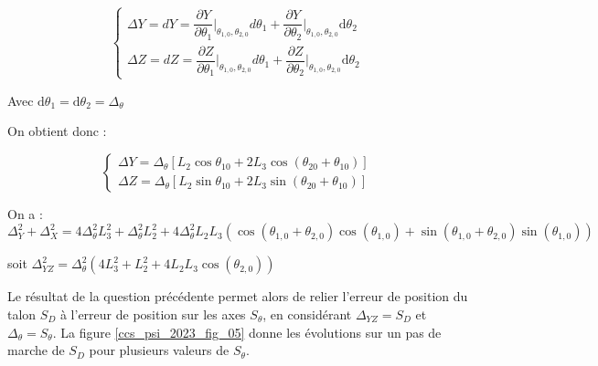 \begin{corrige}
\begin{enumerate}
$$
\left\{
\begin{array}{l}
\Delta Y=d Y=\dfrac{\partial Y}{\partial \theta_1}\vert_{\theta_{1,0},\theta_{2,0}}d\theta_1+\dfrac{\partial Y}{\partial \theta_2}\vert_{\theta_{1,0},\theta_{2,0}}\text{d}\theta_2\\
\Delta Z=d Z=\dfrac{\partial Z}{\partial \theta_1}\vert_{\theta_{1,0},\theta_{2,0}}d\theta_1+\dfrac{\partial Z}{\partial \theta_2}\vert_{\theta_{1,0},\theta_{2,0}}\text{d}\theta_2
\end{array}
\right.
$$

Avec $\text{d}\theta_1=\text{d}\theta_2=\Delta_{\theta}$

On obtient donc : 

$$
\left\{
\begin{array}{l}
\Delta Y=\Delta_{\theta}\left[L_2\cos\theta_{10}+2L_3\cos(\theta_{20}+\theta_{10})\right]\\
\Delta Z=\Delta_{\theta}\left[L_2\sin\theta_{10}+2L_3\sin(\theta_{20}+\theta_{10})\right]
\end{array}
\right.
$$

\end{enumerate}

\end{corrige}
\else
\fi

\ifprof
\begin{corrige}
On a : 
$\Delta_{Y}^2 + \Delta_{X}^2 = 4\Delta_{\theta}^2L_3^2 + \Delta_{\theta}^2L_2^2 
+ 4\Delta_{\theta}^2 L_2 L_3 \left( \cos \left(\theta_{1,0}+ \theta_{2,0}\right)  \cos \left(\theta_{1,0}\right)
+  \sin \left(\theta_{1,0}+ \theta_{2,0}\right)  \sin \left(\theta_{1,0}\right) \right)$

soit 
$\Delta_{YZ}^2 = \Delta_{\theta}^2 \left(4L_3^2 + L_2^2 
+ 4 L_2 L_3 \cos \left(\theta_{2,0} \right)\right)$
\end{corrige}
\else
\fi

\ifprof
\else
Le résultat de la question précédente permet alors de relier l'erreur de position du talon $S_{D}$ à l'erreur de position sur les axes $S_{\theta}$, en considérant $\Delta_{Y Z}=S_{D}$ et $\Delta_{\theta}=S_{\theta}$. La figure \ref{ccs_psi_2023_fig_05} donne les évolutions sur un pas de marche de $S_{D}$ pour plusieurs valeurs de $S_{\theta}$.


